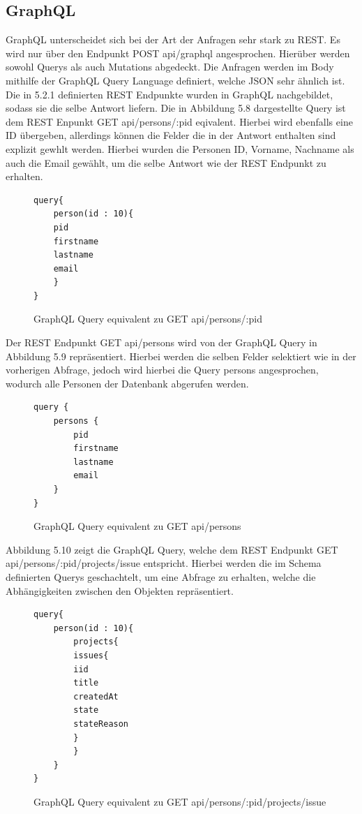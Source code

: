 \subsection{GraphQL}
GraphQL unterscheidet sich bei der Art der Anfragen sehr stark zu REST. Es wird nur über den Endpunkt POST api/graphql angesprochen. Hierüber werden sowohl Querys als auch Mutations abgedeckt. Die Anfragen werden im Body mithilfe der GraphQL Query Language definiert, welche JSON sehr ähnlich ist. Die in 5.2.1 definierten REST Endpunkte wurden in GraphQL nachgebildet, sodass sie die selbe Antwort liefern. Die in Abbildung 5.8 dargestellte Query ist dem REST Enpunkt GET api/persons/:pid eqivalent. Hierbei wird ebenfalls eine ID übergeben, allerdings können die Felder die in der Antwort enthalten sind explizit gewhlt werden. Hierbei wurden die Personen ID, Vorname, Nachname als auch die Email gewählt, um die selbe Antwort wie der REST Endpunkt zu erhalten. 
\begin{figure}[H]
\begin{center}
\begin{BVerbatim}
query{
    person(id : 10){
	pid
	firstname
	lastname
	email
    }
}
\end{BVerbatim}
\end{center}
\caption{GraphQL Query equivalent zu GET api/persons/:pid}
\end{figure}
\noindent
Der REST Endpunkt GET api/persons wird von der GraphQL Query in Abbildung 5.9 repräsentiert. Hierbei werden die selben Felder selektiert wie in der vorherigen Abfrage, jedoch wird hierbei die Query persons angesprochen, wodurch alle Personen der Datenbank abgerufen werden.
\begin{figure}[H]
\begin{center}
\begin{BVerbatim}
query {
    persons {
        pid
        firstname
        lastname
        email
    }
}
\end{BVerbatim}
\end{center}
\caption{GraphQL Query equivalent zu GET api/persons}
\end{figure}
\noindent
Abbildung 5.10 zeigt die GraphQL Query, welche dem REST Endpunkt GET api/persons/:pid/projects/issue entspricht. Hierbei werden die im Schema definierten Querys geschachtelt, um eine Abfrage zu erhalten, welche die Abhängigkeiten zwischen den Objekten repräsentiert.
\begin{figure}[H]
\begin{center}
\begin{BVerbatim}
query{
    person(id : 10){
        projects{
	    issues{
		iid
		title
		createdAt
		state
		stateReason
	    }
        }
    }
}
\end{BVerbatim}
\end{center}
\caption{GraphQL Query equivalent zu GET api/persons/:pid/projects/issue}
\end{figure}
